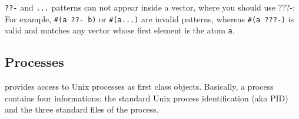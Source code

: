 \begin{note}
{\tt ??-} and \verb#...# patterns can not appear
inside a vector, where you should use ???-: For example, {\tt \#(a
??- b)} or {\tt \#(a...)} are invalid patterns, whereas {\tt \#(a
???-)} is valid and matches any vector whose first element is the atom
{\tt a}.
\end{note}



\subsection{Processes}

\label{process-type}
{\stk} provides access to Unix processes as first class objects. Basically,
a process contains four informations: the standard Unix process
identification (aka PID) and the three standard files
of the process.

